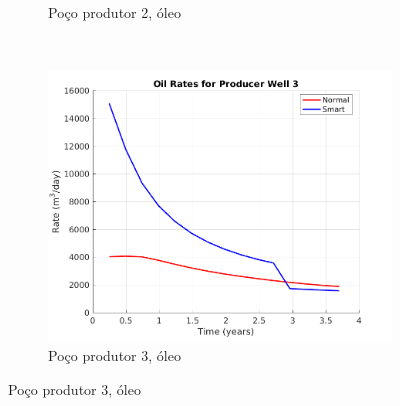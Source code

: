 \begin{figure}[!ht]
\begin{subfigure}[b]{.3\textwidth}
		\caption{Po\c{c}o produtor 2, \'{o}leo}
		\label{SSAIGUP_OilWell2}
	\end{subfigure}
	~
	\begin{subfigure}[b]{.3\textwidth}
		\includegraphics[width=\textwidth]{figs/resultadosSSAIGUP/SSAIGUP_OilWell3_Zoom}
		\caption{Po\c{c}o produtor 3, \'{o}leo}
		\label{SSAIGUP_OilWell3}
	\end{subfigure}


\end{figure}
